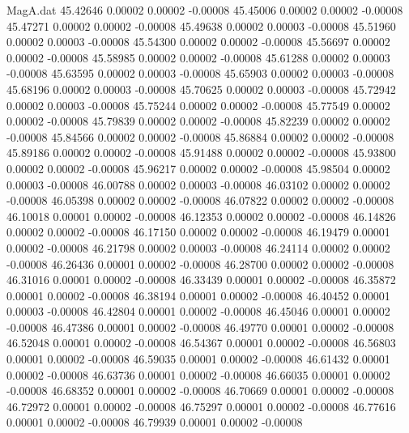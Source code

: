 \begin{filecontents}{MagA.dat}
  45.42646    0.00002    0.00002   -0.00008
  45.45006    0.00002    0.00002   -0.00008
  45.47271    0.00002    0.00002   -0.00008
  45.49638    0.00002    0.00003   -0.00008
  45.51960    0.00002    0.00003   -0.00008
  45.54300    0.00002    0.00002   -0.00008
  45.56697    0.00002    0.00002   -0.00008
  45.58985    0.00002    0.00002   -0.00008
  45.61288    0.00002    0.00003   -0.00008
  45.63595    0.00002    0.00003   -0.00008
  45.65903    0.00002    0.00003   -0.00008
  45.68196    0.00002    0.00003   -0.00008
  45.70625    0.00002    0.00003   -0.00008
  45.72942    0.00002    0.00003   -0.00008
  45.75244    0.00002    0.00002   -0.00008
  45.77549    0.00002    0.00002   -0.00008
  45.79839    0.00002    0.00002   -0.00008
  45.82239    0.00002    0.00002   -0.00008
  45.84566    0.00002    0.00002   -0.00008
  45.86884    0.00002    0.00002   -0.00008
  45.89186    0.00002    0.00002   -0.00008
  45.91488    0.00002    0.00002   -0.00008
  45.93800    0.00002    0.00002   -0.00008
  45.96217    0.00002    0.00002   -0.00008
  45.98504    0.00002    0.00003   -0.00008
  46.00788    0.00002    0.00003   -0.00008
  46.03102    0.00002    0.00002   -0.00008
  46.05398    0.00002    0.00002   -0.00008
  46.07822    0.00002    0.00002   -0.00008
  46.10018    0.00001    0.00002   -0.00008
  46.12353    0.00002    0.00002   -0.00008
  46.14826    0.00002    0.00002   -0.00008
  46.17150    0.00002    0.00002   -0.00008
  46.19479    0.00001    0.00002   -0.00008
  46.21798    0.00002    0.00003   -0.00008
  46.24114    0.00002    0.00002   -0.00008
  46.26436    0.00001    0.00002   -0.00008
  46.28700    0.00002    0.00002   -0.00008
  46.31016    0.00001    0.00002   -0.00008
  46.33439    0.00001    0.00002   -0.00008
  46.35872    0.00001    0.00002   -0.00008
  46.38194    0.00001    0.00002   -0.00008
  46.40452    0.00001    0.00003   -0.00008
  46.42804    0.00001    0.00002   -0.00008
  46.45046    0.00001    0.00002   -0.00008
  46.47386    0.00001    0.00002   -0.00008
  46.49770    0.00001    0.00002   -0.00008
  46.52048    0.00001    0.00002   -0.00008
  46.54367    0.00001    0.00002   -0.00008
  46.56803    0.00001    0.00002   -0.00008
  46.59035    0.00001    0.00002   -0.00008
  46.61432    0.00001    0.00002   -0.00008
  46.63736    0.00001    0.00002   -0.00008
  46.66035    0.00001    0.00002   -0.00008
  46.68352    0.00001    0.00002   -0.00008
  46.70669    0.00001    0.00002   -0.00008
  46.72972    0.00001    0.00002   -0.00008
  46.75297    0.00001    0.00002   -0.00008
  46.77616    0.00001    0.00002   -0.00008
  46.79939    0.00001    0.00002   -0.00008

\end{filecontents}
